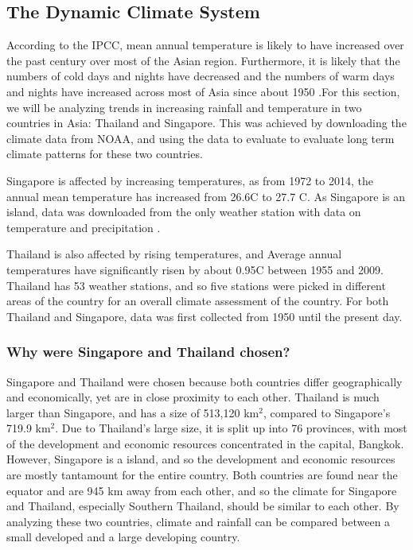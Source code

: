  

\subsection{The Dynamic Climate System}
According to the IPCC, mean annual temperature is likely to have increased over the past century over most of the Asian region. Furthermore, it is likely that the numbers of cold days and nights have decreased and the numbers of warm days and nights have increased across most of Asia since about 1950 \citep{ipcc}.For this section, we will be analyzing trends in increasing rainfall and temperature in two countries in Asia: Thailand and Singapore. This was achieved by downloading the climate data from NOAA, and using the data to evaluate to evaluate long term climate patterns for these two countries. 

Singapore is affected by increasing temperatures, as from 1972 to 2014, the annual mean temperature has increased from 26.6\degree C to 27.7 \degree C. As Singapore is an island, data was downloaded from the only weather station with data on temperature and precipitation \citep{singaporeclimatechange}. 

Thailand is also affected by rising temperatures, and Average annual temperatures have significantly risen by about 0.95\degree C between 1955 and 2009. Thailand has 53 weather stations, and so five stations were picked in different areas of the country for an overall climate assessment of the country. For  both Thailand and Singapore, data was first collected from 1950 until the present day. 

\subsubsection{Why were Singapore and Thailand chosen?}

Singapore and Thailand were chosen because both countries differ geographically and economically, yet are in close proximity to each other. Thailand is much larger than Singapore, and has a size of 513,120 km$^2$, compared to Singapore's 719.9 km$^2$. Due to Thailand's large size, it is split up into 76 provinces, with most of the development and economic resources concentrated in the capital, Bangkok. However, Singapore is a island, and so the development and economic resources are mostly tantamount for the entire country. Both countries are found near the equator and are 945 km away from each other, and so the climate for Singapore and Thailand, especially Southern Thailand, should be similar to each other. By analyzing these two countries, climate and rainfall can be compared between a small developed and a large developing country.

